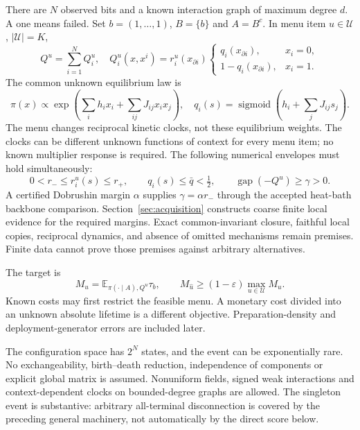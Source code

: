 \documentclass[11pt,a4paper]{article}
\newcommand{\E}{\mathbb E}
\newcommand{\eps}{\varepsilon}
\newcommand{\sig}{\operatorname{sigmoid}}
\begin{document}
There are $N$ observed bits and a known interaction graph of maximum degree $d$. A one means failed. Set $b=(1,\ldots,1)$, $B=\{b\}$ and $A=B^c$. In menu item $u\in\mathcal U$, $|\mathcal U|=K$,
\begin{equation}
 Q^u=\sum_{i=1}^NQ_i^u,\quad Q_i^u(x,x^i)=r_i^u(x_{\partial i})
 \begin{cases}q_i(x_{\partial i}),&x_i=0,\\1-q_i(x_{\partial i}),&x_i=1.\end{cases}
 \label{eq:model}
\end{equation}
The common unknown equilibrium law is
\begin{equation}
 \pi(x)\propto\exp\left(\sum_i h_i x_i+\sum_{ij}J_{ij}x_ix_j\right),\quad
 q_i(s)=\sig\left(h_i+\sum_jJ_{ij}s_j\right).
 \label{eq:gibbs}
\end{equation}
The menu changes reciprocal kinetic clocks, not these equilibrium weights. The clocks can be different unknown functions of context for every menu item; no known multiplier response is required. The following numerical envelopes must hold simultaneously:
\begin{equation}
 0<r_-\le r_i^u(s)\le r_+,\qquad q_i(s)\le\bar q<\tfrac12,\qquad
 \operatorname{gap}(-Q^u)\ge\gamma>0.
 \label{eq:envelopes}
\end{equation}
A certified Dobrushin margin $\alpha$ supplies $\gamma=\alpha r_-$ through the accepted heat-bath backbone comparison. Section~\ref{sec:acquisition} constructs coarse finite local evidence for the required margins. Exact common-invariant closure, faithful local copies, reciprocal dynamics, and absence of omitted mechanisms remain premises. Finite data cannot prove those premises against arbitrary alternatives.

The target is
\begin{equation}
 M_u=\E_{\pi(\cdot\mid A),Q^u}\tau_b,\qquad
 M_{\widehat u}\ge(1-\eps)\max_{u\in\mathcal U}M_u.
 \label{eq:goal}
\end{equation}
Known costs may first restrict the feasible menu. A monetary cost divided into an unknown absolute lifetime is a different objective. Preparation-density and deployment-generator errors are included later.

The configuration space has $2^N$ states, and the event can be exponentially rare. No exchangeability, birth--death reduction, independence of components or explicit global matrix is assumed. Nonuniform fields, signed weak interactions and context-dependent clocks on bounded-degree graphs are allowed. The singleton event is substantive: arbitrary all-terminal disconnection is covered by the preceding general machinery, not automatically by the direct score below.




\end{document}
